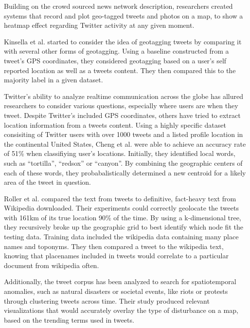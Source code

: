 \documentclass[midd]{thesis}
\begin{document}
Building on the crowd sourced news network description, researchers created systems that record and plot geo-tagged tweets and photos on a map, to show a heatmap effect regarding Twitter activity at any given moment. \cite{nakaji2012visualization} \cite{yanai2012world}

Kinsella et al. \cite{kinsella2011m} started to consider the idea of geotagging tweets by comparing it with several other forms of geotagging. Using a baseline constructed from a tweet's GPS coordinates, they considered geotagging based on a user's self reported location as well as a tweets content. They then compared this to the majority label in a given dataset.

Twitter's ability to analyze realtime communication across the globe has allured researchers to consider various questions, especially where users are when they tweet. Despite Twitter's included GPS coordinates, others have tried to extract location information from a tweets content. Using a highly specific dataset consisiting of Twitter users with over 1000 tweets and a listed profile location in the continental United States, Cheng et al. \cite{cheng2010you} were able to achieve an accuracy rate of 51\% when classifiying user's locations. Initially, they identified local words, such as ``tortilla'', ``redsox'' or ``canyon''. By combining the geographic centers of each of these words, they probabalistically determined a new centroid for a likely area of the tweet in question. 

Roller et al. \cite{roller2012supervised} compared the text from tweets to definitive, fact-heavy text from Wikipedia downloaded. Their experiments could correctly geolocate the tweets with 161km of its true location 90\% of the time. By using a k-dimensional tree, they recursively broke up the geographic grid to best identify which node fit the testing data. Training data included the wikipedia data containing many place names and toponyms. They then compared a tweet to the wikipedia text, knowing that placenames included in tweets would correlate to a particular document from wikipedia often.

Additionally, the tweet corpus has been analyzed to search for spatiotemporal anomalies, such as natural disasters or societal events, like riots or protests through clustering tweets across time. Their study produced relevant visualizations that would accurately overlay the type of disturbance on a map, based on the trending terms used in tweets. \cite{thom2012spatiotemporal} 
\end{document}
